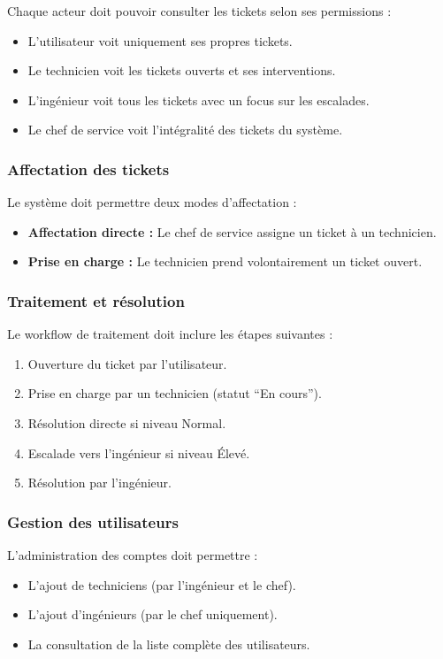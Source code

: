 \documentclass[12pt,a4paper,oneside]{report}
\begin{document}
Chaque acteur doit pouvoir consulter les tickets selon ses permissions :
\begin{itemize}
    \item L'utilisateur voit uniquement ses propres tickets.
    \item Le technicien voit les tickets ouverts et ses interventions.
    \item L'ingénieur voit tous les tickets avec un focus sur les escalades.
    \item Le chef de service voit l'intégralité des tickets du système.
\end{itemize}

\subsubsection{Affectation des tickets}

Le système doit permettre deux modes d'affectation :
\begin{itemize}
    \item \textbf{Affectation directe :} Le chef de service assigne un ticket à un technicien.
    \item \textbf{Prise en charge :} Le technicien prend volontairement un ticket ouvert.
\end{itemize}

\subsubsection{Traitement et résolution}

Le workflow de traitement doit inclure les étapes suivantes :
\begin{enumerate}
    \item Ouverture du ticket par l'utilisateur.
    \item Prise en charge par un technicien (statut ``En cours'').
    \item Résolution directe si niveau Normal.
    \item Escalade vers l'ingénieur si niveau Élevé.
    \item Résolution par l'ingénieur.
\end{enumerate}

\subsubsection{Gestion des utilisateurs}

L'administration des comptes doit permettre :
\begin{itemize}
    \item L'ajout de techniciens (par l'ingénieur et le chef).
    \item L'ajout d'ingénieurs (par le chef uniquement).
    \item La consultation de la liste complète des utilisateurs.
\end{itemize}
\end{document}
